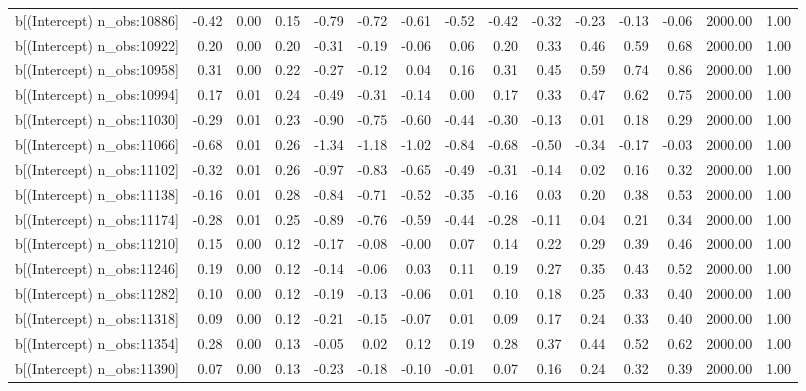\begin{table}[ht]
\begin{tabular}{rrrrrrrrrrrrrrr}
  b[(Intercept) n\_obs:10886] & -0.42 & 0.00 & 0.15 & -0.79 & -0.72 & -0.61 & -0.52 & -0.42 & -0.32 & -0.23 & -0.13 & -0.06 & 2000.00 & 1.00 \\ 
  b[(Intercept) n\_obs:10922] & 0.20 & 0.00 & 0.20 & -0.31 & -0.19 & -0.06 & 0.06 & 0.20 & 0.33 & 0.46 & 0.59 & 0.68 & 2000.00 & 1.00 \\ 
  b[(Intercept) n\_obs:10958] & 0.31 & 0.00 & 0.22 & -0.27 & -0.12 & 0.04 & 0.16 & 0.31 & 0.45 & 0.59 & 0.74 & 0.86 & 2000.00 & 1.00 \\ 
  b[(Intercept) n\_obs:10994] & 0.17 & 0.01 & 0.24 & -0.49 & -0.31 & -0.14 & 0.00 & 0.17 & 0.33 & 0.47 & 0.62 & 0.75 & 2000.00 & 1.00 \\ 
  b[(Intercept) n\_obs:11030] & -0.29 & 0.01 & 0.23 & -0.90 & -0.75 & -0.60 & -0.44 & -0.30 & -0.13 & 0.01 & 0.18 & 0.29 & 2000.00 & 1.00 \\ 
  b[(Intercept) n\_obs:11066] & -0.68 & 0.01 & 0.26 & -1.34 & -1.18 & -1.02 & -0.84 & -0.68 & -0.50 & -0.34 & -0.17 & -0.03 & 2000.00 & 1.00 \\ 
  b[(Intercept) n\_obs:11102] & -0.32 & 0.01 & 0.26 & -0.97 & -0.83 & -0.65 & -0.49 & -0.31 & -0.14 & 0.02 & 0.16 & 0.32 & 2000.00 & 1.00 \\ 
  b[(Intercept) n\_obs:11138] & -0.16 & 0.01 & 0.28 & -0.84 & -0.71 & -0.52 & -0.35 & -0.16 & 0.03 & 0.20 & 0.38 & 0.53 & 2000.00 & 1.00 \\ 
  b[(Intercept) n\_obs:11174] & -0.28 & 0.01 & 0.25 & -0.89 & -0.76 & -0.59 & -0.44 & -0.28 & -0.11 & 0.04 & 0.21 & 0.34 & 2000.00 & 1.00 \\ 
  b[(Intercept) n\_obs:11210] & 0.15 & 0.00 & 0.12 & -0.17 & -0.08 & -0.00 & 0.07 & 0.14 & 0.22 & 0.29 & 0.39 & 0.46 & 2000.00 & 1.00 \\ 
  b[(Intercept) n\_obs:11246] & 0.19 & 0.00 & 0.12 & -0.14 & -0.06 & 0.03 & 0.11 & 0.19 & 0.27 & 0.35 & 0.43 & 0.52 & 2000.00 & 1.00 \\ 
  b[(Intercept) n\_obs:11282] & 0.10 & 0.00 & 0.12 & -0.19 & -0.13 & -0.06 & 0.01 & 0.10 & 0.18 & 0.25 & 0.33 & 0.40 & 2000.00 & 1.00 \\ 
  b[(Intercept) n\_obs:11318] & 0.09 & 0.00 & 0.12 & -0.21 & -0.15 & -0.07 & 0.01 & 0.09 & 0.17 & 0.24 & 0.33 & 0.40 & 2000.00 & 1.00 \\ 
  b[(Intercept) n\_obs:11354] & 0.28 & 0.00 & 0.13 & -0.05 & 0.02 & 0.12 & 0.19 & 0.28 & 0.37 & 0.44 & 0.52 & 0.62 & 2000.00 & 1.00 \\ 
  b[(Intercept) n\_obs:11390] & 0.07 & 0.00 & 0.13 & -0.23 & -0.18 & -0.10 & -0.01 & 0.07 & 0.16 & 0.24 & 0.32 & 0.39 & 2000.00 & 1.00 \\ 

\end{tabular}
\end{table}
